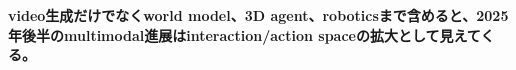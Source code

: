 \noindent\textbf{video生成だけでなくworld model、3D agent、roboticsまで含めると、2025年後半のmultimodal進展はinteraction/action spaceの拡大として見えてくる。}\autocite{src-dd5d9b8662f3}
